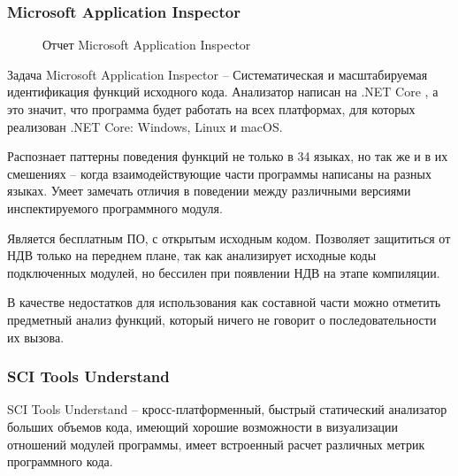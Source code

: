 \subsubsection{Microsoft Application Inspector}\label{sec:ch1/sec3/sub1/sub1}

\begin{figure}[!htbp]
    \caption{Отчет Microsoft Application Inspector\label{fig:ms-app-inspector}}
\end{figure}
Задача Microsoft Application Inspector -- Систематическая и масштабируемая идентификация функций исходного кода.
Анализатор написан на .NET Core \autocite{net-core}, а это значит, что программа будет работать на всех платформах,
для которых реализован .NET Core: Windows, Linux и macOS.

Распознает паттерны поведения функций не только в 34 языках, 
но так же и в их смешениях -- когда взаимодействующие части программы
написаны на разных языках.
Умеет замечать отличия в поведении между различными версиями инспектируемого 
программного модуля. 

Является бесплатным ПО, с открытым исходным кодом.
Позволяет защититься от НДВ только на переднем плане, так как анализирует исходные коды
подключенных модулей, но бессилен при появлении НДВ на этапе компиляции.

В качестве недостатков для использования как составной части {\ProgModule} можно 
отметить предметный анализ функций, который ничего не говорит 
о последовательности их вызова.

\subsubsection{SCI Tools Understand}\label{sec:ch1/sec3/sub1/sub2}
SCI Tools Understand -- кросс-платформенный, быстрый статический анализатор больших объемов кода,
имеющий хорошие возможности в визуализации отношений модулей программы,
имеет встроенный расчет различных метрик программного кода.

